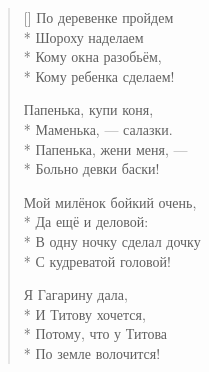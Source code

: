 \documentclass[a4paper,oneside,14pt]{scrbook}
\begin{document}
\begin{verse}[\versewidth]
        По деревенке пройдем\\*
        Шороху наделаем\\*
        Кому окна разобьём,\\*
        Кому ребенка сделаем!
        
        Папенька, купи коня,\\*
        Маменька, --- салазки.\\*
        Папенька, жени меня, ---\\*
        Больно девки баски!
        
        Мой милёнок бойкий очень,\\*
        Да ещё и деловой:\\*
        В одну ночку сделал дочку\\*
        С кудреватой головой!
        
        Я Гагарину дала,\\*
        И Титову хочется,\\*
        Потому, что у Титова\\*
        По земле волочится!
        
    \end{verse}    
    
    
\end{document}
